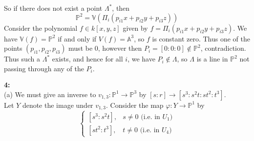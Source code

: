 \documentclass[a4paper]{article}
\begin{document}
     So if there does not exist a point $\Lambda^{*}$, then
     \[
     \mathbb{P}^2 =
     \mathbb{V} \left( \Pi_i
     \left( p_{i 1} x+ p_{i 2}y + p_{i 3}z \right) \right) 
     \] 
     Consider the polynomial
     $f \in k\left[ x,y,z \right] $ given by
     $f = \Pi_i
     \left( p_{i 1}x + p_{i 2}y + p_{i 3}z \right) $.
    We have
    $\mathbb{V} (f) = \mathbb{P}^2$ if and only if
    $V(f) = \mathbb{A}^3$, so
    $f$ is constant zero. Thus one of the points
    $\left( p_{i 1}, p_{i 2}, p_{i 3} \right) $ must be
    $0$, however
    then $P_i = \left[ 0:0:0 \right] \not\in  \mathbb{P}^2$, contradiction.
    Thus such a $\Lambda^{*}$ exists, and hence
    for all $i$, we have
    $P_i \not\in \Lambda$, so
     $\Lambda$ is a line in $\mathbb{P}^2$ not passing through any
     of the $P_i$.\\
     \linebreak
     

 

     \textbf{4:}\\
     (a) We must give an inverse to
     $v_{1,3}  \colon \mathbb{P}^{1} \to \mathbb{P}^3$ by
     $\left[ s : r \right] \to 
     \left[ s^3 : s^2 t : s t^2 : t^3 \right] $.\\
     Let $Y$ denote the image under
     $v_{1,3}$. Consider the map
     $\varphi  \colon Y \to \mathbb{P}^{1}$ by
     \[
     \begin{cases}
         \left[ s^3 : s^2 t \right], & s \neq 0 \text{ (i.e. in } U_1)\\
         \left[ s t^2 : t^3 \right], & t\neq 0
         \text{ (i.e. in } U_4)
     \end{cases}
     \] 
     
\end{document}
